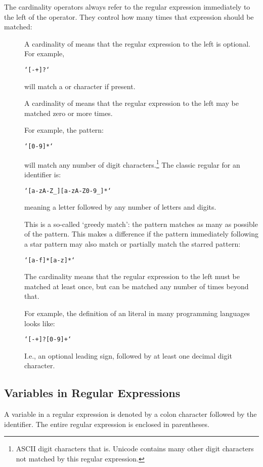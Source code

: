 The cardinality operators always refer to the regular expression immediately to the left of the operator. They control how many times that expression should be matched:
\begin{description}
\item[] A cardinality of  means that the regular expression to the left is optional. For example,
\begin{alltt}
`[-+]?`
\end{alltt}
will match a \q{-} or \q{+} character if present.
\item[\q{*}]
A cardinality of \q{*} means that the regular expression to the left may be matched zero or more times.

For example, the pattern:
\begin{alltt}
`[0-9]*`
\end{alltt}
will match any number of digit characters.\footnote{ASCII digit characters that is. Unicode contains many other digit characters not matched by this regular expression.} The classic regular for an identifier is:
\begin{alltt}
`[a-zA-Z_][a-zA-Z0-9_]*`
\end{alltt}
meaning a letter followed by any number of letters and digits.

\begin{aside}
This is a so-called `greedy match': the pattern matches as many as possible of the pattern. This makes a difference if the pattern immediately following a star pattern may also match or partially match the starred pattern:
\begin{alltt}
`[a-f]*[a-z]*`
\end{alltt}
\end{aside}
\item[\q{+}] The \q{+} cardinality means that the regular expression to the left must be matched at least once, but can be matched any number of times beyond that.

For example, the definition of an  literal in many programming languages looks like:
\begin{alltt}
`[-+]?[0-9]+`
\end{alltt}
I.e., an optional leading sign, followed by at least one decimal digit character.
\end{description}

\subsection{Variables in Regular Expressions}
\label{variableRegexp}
A variable in a regular expression is denoted by a colon character followed by the identifier. The entire regular expression is enclosed in parentheses.

